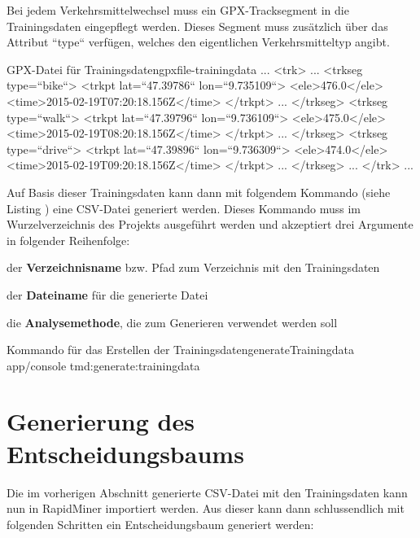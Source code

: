 Bei jedem Verkehrsmittelwechsel muss ein GPX-Tracksegment in die Trainingsdaten eingepflegt werden. Dieses Segment muss zusätzlich über das Attribut ``type`` verfügen, welches den eigentlichen Verkehrsmitteltyp angibt.

\begin{code}[xml]{GPX-Datei für Trainingsdaten}{gpxfile-trainingdata}
...
    <trk>
        ...
        <trkseg type=``bike``>
            <trkpt lat=``47.39786`` lon=``9.735109``>
                <ele>476.0</ele>
                <time>2015-02-19T07:20:18.156Z</time>
            </trkpt>
            ...
        </trkseg>
        <trkseg type=``walk``>
        	   <trkpt lat=``47.39796`` lon=``9.736109``>
               <ele>475.0</ele>
               <time>2015-02-19T08:20:18.156Z</time>
            </trkpt>
            		...
        </trkseg>
        <trkseg type=``drive``>
        	   <trkpt lat=``47.39896`` lon=``9.736309``>
               <ele>474.0</ele>
               <time>2015-02-19T09:20:18.156Z</time>
            </trkpt>
            		...
        </trkseg>
        ...
    </trk>
...
\end{code}

Auf Basis dieser Trainingsdaten kann dann mit folgendem Kommando (siehe Listing ) eine CSV-Datei generiert werden. Dieses Kommando muss im Wurzelverzeichnis des Projekts ausgeführt werden und akzeptiert drei Argumente in folgender Reihenfolge:

\begin{pitemize}
\item der \textbf{Verzeichnisname} bzw. Pfad zum Verzeichnis mit den Trainingsdaten
\item der \textbf{Dateiname} für die generierte Datei
\item die \textbf{Analysemethode}, die zum Generieren verwendet werden soll
\end{pitemize}

\begin{code}[xml]{Kommando für das Erstellen der Trainingsdaten}{generateTrainingdata}
app/console tmd:generate:trainingdata
\end{code}

\section*{Generierung des Entscheidungsbaums}
Die im vorherigen Abschnitt generierte CSV-Datei mit den Trainingsdaten kann nun in RapidMiner importiert werden. Aus dieser kann dann schlussendlich mit folgenden Schritten ein Entscheidungsbaum generiert werden: 


